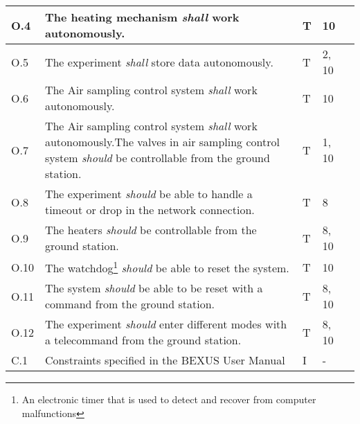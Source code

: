 \begin{longtable}[]{|m{}| m{} |m{} |m{}|m{}|}
O.4  & The heating mechanism \textit{shall} work autonomously.                                                                                                               &        T      & 10            &        \\ \hline
O.5  & The experiment \textit{shall} store data autonomously.                                                                                                                &       T       & 2, 10            &        \\ \hline
O.6  & The Air sampling control system \textit{shall} work autonomously.                                                                                                     &        T      & 10            &        \\ \hline
O.7  & The Air sampling control system \textit{shall} work autonomously.The valves in air sampling control system \textit{should} be controllable from the ground station. &      T        & 1, 10            &        \\ \hline
O.8  & The experiment \textit{should} be able to handle a timeout or drop in the network connection.                                                                         &    T          &  8           &        \\ \hline
O.9  & The heaters \textit{should} be controllable from the ground station.                                                                                                  &     T         &  8, 10           &        \\ \hline
O.10 & The watchdog\footnote{An electronic timer that is used to detect and recover from computer malfunctions} \textit{should} be able to reset the system.               &     T         & 10            &        \\ \hline
O.11 & The system \textit{should} be able to be reset with a command from the ground station.                                                                                &     T         & 8, 10            &        \\ \hline
O.12 & The experiment \textit{should} enter different modes with a telecommand from the ground station.                                                                      &      T        & 8, 10            &        \\ \hline
C.1  & Constraints specified in the BEXUS User Manual                                                                                                                          &       I       & -            &        \\ \hline

\end{longtable}
